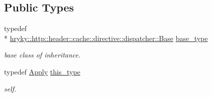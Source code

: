 \subsection*{Public Types}
\begin{DoxyCompactItemize}
\item 
\hypertarget{classhryky_1_1http_1_1header_1_1cache_1_1directive_1_1dispatcher_1_1_apply_a1de2e875cc06bfa9daa3f4eefe87b63e}{typedef \\*
\hyperlink{classhryky_1_1http_1_1header_1_1cache_1_1directive_1_1dispatcher_1_1_base}{hryky\-::http\-::header\-::cache\-::directive\-::dispatcher\-::\-Base} \hyperlink{classhryky_1_1http_1_1header_1_1cache_1_1directive_1_1dispatcher_1_1_apply_a1de2e875cc06bfa9daa3f4eefe87b63e}{base\-\_\-type}}\label{classhryky_1_1http_1_1header_1_1cache_1_1directive_1_1dispatcher_1_1_apply_a1de2e875cc06bfa9daa3f4eefe87b63e}

\begin{DoxyCompactList}\small\item\em base class of inheritance. \end{DoxyCompactList}\item 
\hypertarget{classhryky_1_1http_1_1header_1_1cache_1_1directive_1_1dispatcher_1_1_apply_ae543280f3793accdffa137bcabf76136}{typedef \hyperlink{classhryky_1_1http_1_1header_1_1cache_1_1directive_1_1dispatcher_1_1_apply}{Apply} \hyperlink{classhryky_1_1http_1_1header_1_1cache_1_1directive_1_1dispatcher_1_1_apply_ae543280f3793accdffa137bcabf76136}{this\-\_\-type}}\label{classhryky_1_1http_1_1header_1_1cache_1_1directive_1_1dispatcher_1_1_apply_ae543280f3793accdffa137bcabf76136}

\begin{DoxyCompactList}\small\item\em self. \end{DoxyCompactList}\end{DoxyCompactItemize}
